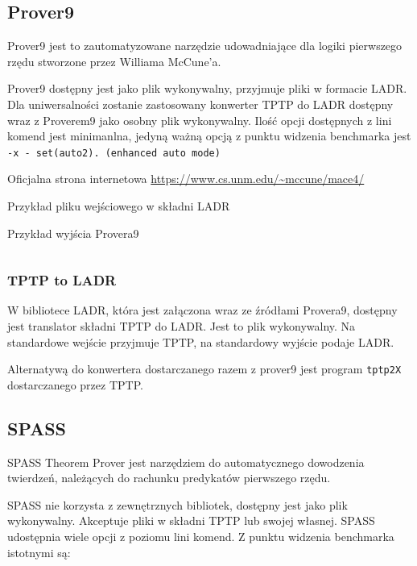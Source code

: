 \documentclass[a4paper,12pt]{article}
\newenvironment{longlisting}{\captionsetup{type=listing}}{}
\begin{document}
\subsection{Prover9}

Prover9 jest to zautomatyzowane narzędzie udowadniające dla logiki pierwszego rzędu stworzone przez Williama McCune’a.

Prover9 dostępny jest jako plik wykonywalny, przyjmuje pliki w formacie \gls{LADR}. Dla uniwersalności zostanie zastosowany konwerter TPTP do LADR dostępny wraz z Proverem9 jako osobny plik wykonywalny. Ilość opcji dostępnych z lini komend jest minimanlna, jedyną ważną opcją z punktu widzenia benchmarka jest \texttt{-x - set(auto2).  (enhanced auto mode)}

\noindent
Oficjalna strona internetowa \url{https://www.cs.unm.edu/~mccune/mace4/}

\begin{longlisting}
  \caption{Przykład pliku wejściowego w składni LADR}
\end{longlisting}

\begin{longlisting}
  \caption{Przykład wyjścia Provera9}
  \inputminted{text}{listings/prover9_example.out}
\end{longlisting}

\subsubsection{TPTP to LADR}

W bibliotece \gls{LADR}, która jest załączona wraz ze źródłami Provera9, dostępny jest translator składni TPTP do LADR. Jest to plik wykonywalny. Na standardowe wejście przyjmuje TPTP, na standardowy wyjście podaje LADR.

Alternatywą do konwertera dostarczanego razem z prover9 jest program \texttt{tptp2X} dostarczanego przez TPTP.

\subsection{SPASS}

SPASS Theorem Prover jest narzędziem do automatycznego dowodzenia twierdzeń, należących do rachunku predykatów pierwszego rzędu.

SPASS nie korzysta z zewnętrznych bibliotek, dostępny jest jako plik wykonywalny. Akceptuje pliki w składni TPTP lub swojej własnej. SPASS udostępnia wiele opcji z poziomu lini komend. Z punktu widzenia benchmarka istotnymi są:
\end{document}
